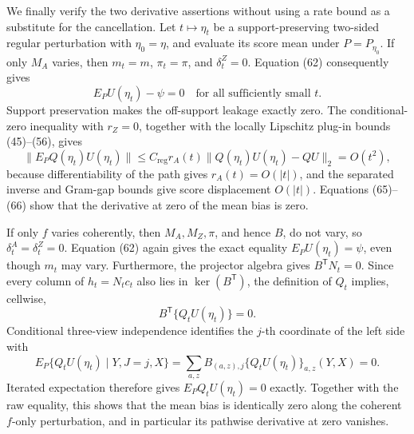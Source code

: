 We finally verify the two derivative assertions without using a rate bound as a substitute for the cancellation.  Let \(t\mapsto\eta_t\) be a support-preserving two-sided regular perturbation with \(\eta_0=\eta\), and evaluate its score mean under \(P=P_{\eta_0}\).  If only \(M_A\) varies, then \(m_t=m\), \(\pi_t=\pi\), and \(\delta^Z_t=0\).  Equation (62) consequently gives
\[
 E_PU(\eta_t)-\psi=0
 \quad\text{for all sufficiently small }t.
 \tag{65}
\]
Support preservation makes the off-support leakage exactly zero.  The conditional-zero inequality with \(r_Z=0\), together with the locally Lipschitz plug-in bounds (45)--(56), gives
\[
 \|E_P Q(\eta_t)U(\eta_t)\|
 \leq C_{\mathrm{reg}}r_A(t)
 \|Q(\eta_t)U(\eta_t)-QU\|_2
 =O(t^2),
 \tag{66}
\]
because differentiability of the path gives \(r_A(t)=O(|t|)\), and the separated inverse and Gram-gap bounds give score displacement \(O(|t|)\).  Equations (65)--(66) show that the derivative at zero of the mean bias is zero.

If only \(f\) varies coherently, then \(M_A,M_Z,\pi\), and hence \(B\), do not vary, so \(\delta^A_t=\delta^Z_t=0\).  Equation (62) again gives the exact equality \(E_PU(\eta_t)=\psi\), even though \(m_t\) may vary.  Furthermore, the projector algebra gives \(B^{\mathsf T}N_t=0\).  Since every column of \(h_t=N_tc_t\) also lies in \(\ker(B^{\mathsf T})\), the definition of \(Q_t\) implies, cellwise,
\[
 B^{\mathsf T}\{Q_tU(\eta_t)\}=0.
 \tag{67}
\]
Conditional three-view independence identifies the \(j\)-th coordinate of the left side with
\[
 E_P\{Q_tU(\eta_t)\mid Y,J=j,X\}
 =\sum_{a,z}B_{(a,z),j}
   \{Q_tU(\eta_t)\}_{a,z}(Y,X)=0.
\]
Iterated expectation therefore gives \(E_PQ_tU(\eta_t)=0\) exactly.  Together with the raw equality, this shows that the mean bias is identically zero along the coherent \(f\)-only perturbation, and in particular its pathwise derivative at zero vanishes.

